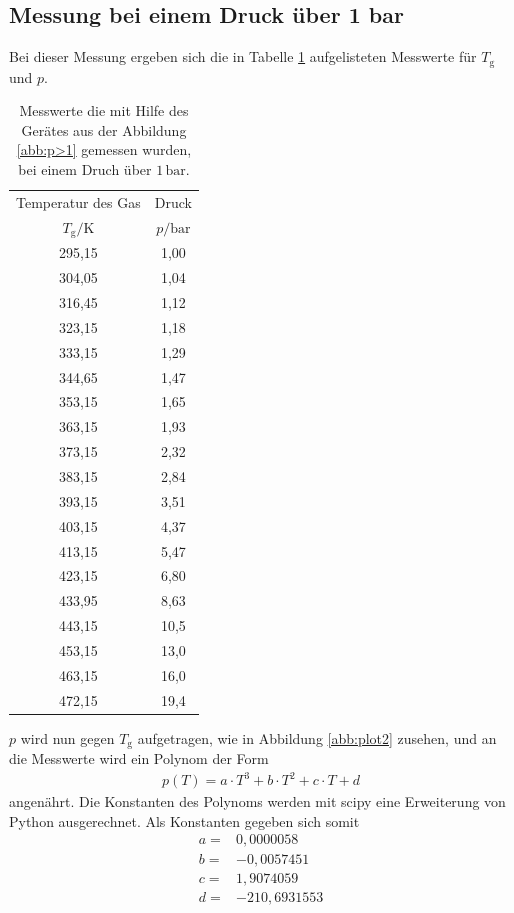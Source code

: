 \subsection{Messung bei einem Druck über 1 bar}
Bei dieser Messung ergeben sich die in Tabelle \ref{tab:p>1} aufgelisteten Messwerte für $T_\mathrm{g}$ und $p$.
\begin{table}   %
  \centering
  \caption{Messwerte die mit Hilfe des Gerätes aus der Abbildung \ref{abb:p>1} gemessen wurden, bei einem Druch über $1\,\si{\bar}$.}
  \label{tab:p>1}
  \begin{tabular}{c c}
    \toprule
    Temperatur des Gas &  Druck \\
    $T_\mathrm{g}/ \si{\kelvin}$ & $p/\si{\bar} $ \\
    \midrule
    295,15 & 1,00\\
    304,05 & 1,04\\
    316,45 & 1,12\\
    323,15 & 1,18\\
    333,15 & 1,29\\
    344,65 & 1,47\\
    353,15 & 1,65\\
    363,15 & 1,93\\
    373,15 & 2,32\\
    383,15 & 2,84\\
    393,15 & 3,51\\
    403,15 & 4,37\\
    413,15 & 5,47\\
    423,15 & 6,80\\
    433,95 & 8,63\\
    443,15 & 10,5\\
    453,15 & 13,0\\
    463,15 & 16,0\\
    472,15 & 19,4\\
    \bottomrule
  \end{tabular}
\end{table}
$p$ wird nun gegen $T_\mathrm{g}$ aufgetragen, wie in Abbildung \ref{abb:plot2} zusehen, und an die Messwerte wird ein Polynom
der Form
\begin{align*}
p(T)=a\cdot T^3+b\cdot T^2 + c\cdot T + d
\end{align*}
angenährt.
Die Konstanten des Polynoms werden mit scipy eine Erweiterung von Python ausgerechnet. Als Konstanten gegeben sich somit
\begin{align*}
  a =&0,0000058\\
  b =&-0,0057451\\
  c =&1,9074059\\
  d =&-210,6931553
\end{align*}
